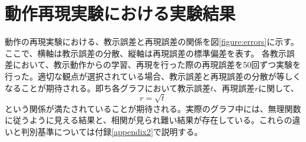 ﻿\appendix
\chapter{動作再現実験における実験結果}\label{appendix1}

動作の再現実験における、教示誤差と再現誤差の関係を図\ref{figure:errors}に示す。
ここで、横軸は教示誤差の分散、縦軸は再現誤差の標準偏差を表す。
各教示誤差において、教示動作からの学習、再現を行った際の再現誤差を50回ずつ実験を行った。適切な観点が選択されている場合、教示誤差と再現誤差の分散が等しくなることが期待される。即ち各グラフにおいて教示誤差$t$、再現誤差$r$に関して、
\[
	r = \sqrt{t}
\]
という関係が満たされていることが期待される。実際のグラフ中には、無理関数に従うように見える結果と、相関が見られ難い結果が存在している。これらの違いと判別基準については付録\ref{appendix2}で説明する。

